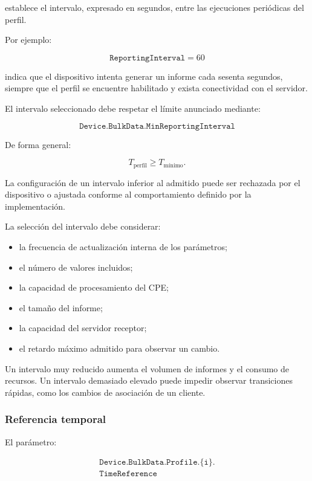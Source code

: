 establece el intervalo, expresado en segundos, entre las ejecuciones
periódicas del perfil.

Por ejemplo:

\[
    \texttt{ReportingInterval} = 60
\]

indica que el dispositivo intenta generar un informe cada sesenta
segundos, siempre que el perfil se encuentre habilitado y exista
conectividad con el servidor.

El intervalo seleccionado debe respetar el límite anunciado mediante:

\[
    \texttt{Device.BulkData.MinReportingInterval}
\]

De forma general:

\[
    T_{\mathrm{perfil}}
    \geq
    T_{\mathrm{mínimo}}.
\]

La configuración de un intervalo inferior al admitido puede ser rechazada
por el dispositivo o ajustada conforme al comportamiento definido por la
implementación.

La selección del intervalo debe considerar:

\begin{itemize}
    \item la frecuencia de actualización interna de los parámetros;
    \item el número de valores incluidos;
    \item la capacidad de procesamiento del CPE;
    \item el tamaño del informe;
    \item la capacidad del servidor receptor;
    \item el retardo máximo admitido para observar un cambio.
\end{itemize}

Un intervalo muy reducido aumenta el volumen de informes y el consumo de
recursos. Un intervalo demasiado elevado puede impedir observar
transiciones rápidas, como los cambios de asociación de un cliente.


\subsubsection*{Referencia temporal}

El parámetro:

\[
\begin{split}
    \texttt{Device.BulkData.Profile.\{i\}.}\\
    \texttt{TimeReference}
\end{split}
\]

